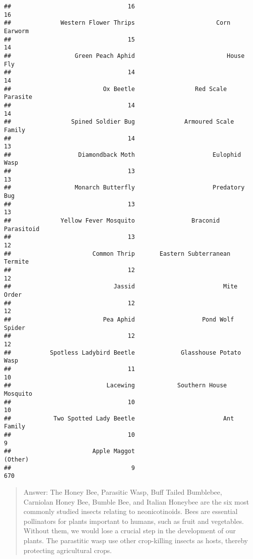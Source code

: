 \documentclass[]{article}
\begin{document}
\begin{verbatim}
##                                 16                                 16 
##              Western Flower Thrips                       Corn Earworm 
##                                 15                                 14 
##                  Green Peach Aphid                          House Fly 
##                                 14                                 14 
##                          Ox Beetle                 Red Scale Parasite 
##                                 14                                 14 
##                 Spined Soldier Bug              Armoured Scale Family 
##                                 14                                 13 
##                   Diamondback Moth                      Eulophid Wasp 
##                                 13                                 13 
##                  Monarch Butterfly                      Predatory Bug 
##                                 13                                 13 
##              Yellow Fever Mosquito                Braconid Parasitoid 
##                                 13                                 12 
##                       Common Thrip       Eastern Subterranean Termite 
##                                 12                                 12 
##                             Jassid                         Mite Order 
##                                 12                                 12 
##                          Pea Aphid                   Pond Wolf Spider 
##                                 12                                 12 
##           Spotless Ladybird Beetle             Glasshouse Potato Wasp 
##                                 11                                 10 
##                           Lacewing            Southern House Mosquito 
##                                 10                                 10 
##            Two Spotted Lady Beetle                         Ant Family 
##                                 10                                  9 
##                       Apple Maggot                            (Other) 
##                                  9                                670
\end{verbatim}

\begin{quote}
Answer: The Honey Bee, Parasitic Wasp, Buff Tailed Bumblebee, Carniolan
Honey Bee, Bumble Bee, and Italian Honeybee are the six most commonly
studied insects relating to neonicotinoids. Bees are essential
pollinators for plants important to humans, such as fruit and
vegetables. Without them, we would lose a crucial step in the
development of our plants. The parastitic wasp use other crop-killing
insects as hosts, thereby protecting agricultural crops.
\end{quote}
\end{document}

